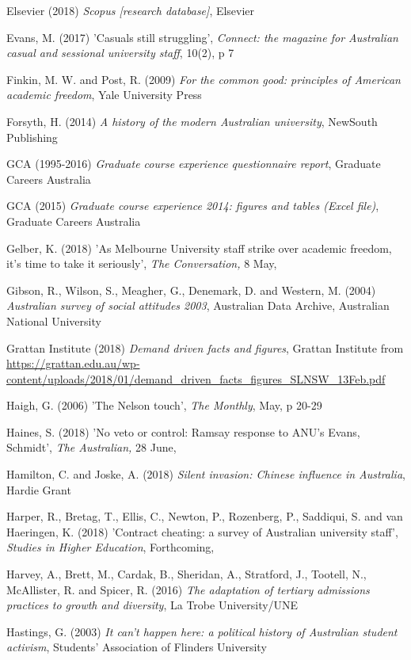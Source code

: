 \documentclass[]{book}
\begin{document}
\protect\hypertarget{_ENREF_113}{}{}Elsevier (2018) \emph{Scopus {[}research database{]}}, Elsevier

\protect\hypertarget{_ENREF_114}{}{}Evans, M. (2017) 'Casuals still struggling', \emph{Connect: the magazine for Australian casual and sessional university staff}, 10(2), p 7

Finkin, M. W. and Post, R. (2009) \emph{For the common good: principles of American academic freedom}, Yale University Press

Forsyth, H. (2014) \emph{A history of the modern Australian university}, NewSouth Publishing

\protect\hypertarget{_ENREF_117}{}{}GCA (1995-2016) \emph{Graduate course experience questionnaire report}, Graduate Careers Australia

GCA (2015) \emph{Graduate course experience 2014: figures and tables (Excel file)}, Graduate Careers Australia

Gelber, K. (2018) 'As Melbourne University staff strike over academic freedom, it's time to take it seriously', \emph{The Conversation,} 8 May,

\protect\hypertarget{_ENREF_120}{}{}Gibson, R., Wilson, S., Meagher, G., Denemark, D. and Western, M. (2004) \emph{Australian survey of social attitudes 2003}, Australian Data Archive, Australian National University

Grattan Institute (2018) \emph{Demand driven facts and figures}, Grattan Institute from \url{https://grattan.edu.au/wp-content/uploads/2018/01/demand_driven_facts_figures_SLNSW_13Feb.pdf}

Haigh, G. (2006) 'The Nelson touch', \emph{The Monthly}, May, p 20-29

Haines, S. (2018) 'No veto or control: Ramsay response to ANU's Evans, Schmidt', \emph{The Australian,} 28 June,

Hamilton, C. and Joske, A. (2018) \emph{Silent invasion: Chinese influence in Australia}, Hardie Grant

Harper, R., Bretag, T., Ellis, C., Newton, P., Rozenberg, P., Saddiqui, S. and van Haeringen, K. (2018) 'Contract cheating: a survey of Australian university staff', \emph{Studies in Higher Education}, Forthcoming,

Harvey, A., Brett, M., Cardak, B., Sheridan, A., Stratford, J., Tootell, N., McAllister, R. and Spicer, R. (2016) \emph{The adaptation of tertiary admissions practices to growth and diversity}, La Trobe University/UNE

Hastings, G. (2003) \emph{It can't happen here: a political history of Australian student activism}, Students' Association of Flinders University
\end{document}
